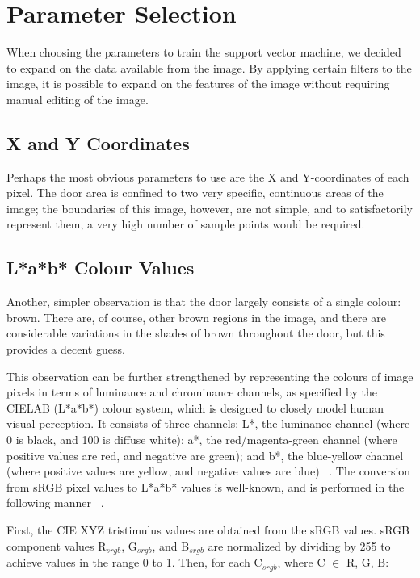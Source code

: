 \chapter{Parameter Selection}

When choosing the parameters to train the support vector machine, we decided to expand on the data available from the image. By applying certain filters to the image, it is possible to expand on the features of the image without requiring manual editing of the image.

\section{X and Y Coordinates}
Perhaps the most obvious parameters to use are the X and Y-coordinates of each pixel.  The door area is confined to two very specific, continuous areas of the image; the boundaries of this image, however, are not simple, and to satisfactorily represent them, a very high number of sample points would be required.

\section{L*a*b* Colour Values}
Another, simpler observation is that the door largely consists of a single colour: brown.  There are, of course, other brown regions in the image, and there are considerable variations in the shades of brown throughout the door, but this provides a decent guess.  

This observation can be further strengthened by representing the colours of image pixels in terms of luminance and chrominance channels, as specified by the CIELAB (L*a*b*) colour system, which is designed to closely model human visual perception.  It consists of three channels: L*, the luminance channel (where 0 is black, and 100 is diffuse white); a*, the red/magenta-green channel (where positive values are red, and negative are green); and b*, the blue-yellow channel (where positive values are yellow, and negative values are blue) ~\cite{berns2000billmeyer}. The conversion from sRGB pixel values to L*a*b* values is well-known, and is performed in the following manner ~\cite{mclaren1976xiii}.

First, the CIE XYZ tristimulus values are obtained from the sRGB values. sRGB component values R$_{srgb}$, G$_{srgb}$, and B$_{srgb}$ are normalized by dividing by 255 to achieve values in the range 0 to 1. Then, for each C$_{srgb}$, where C $\in$ R, G, B:

